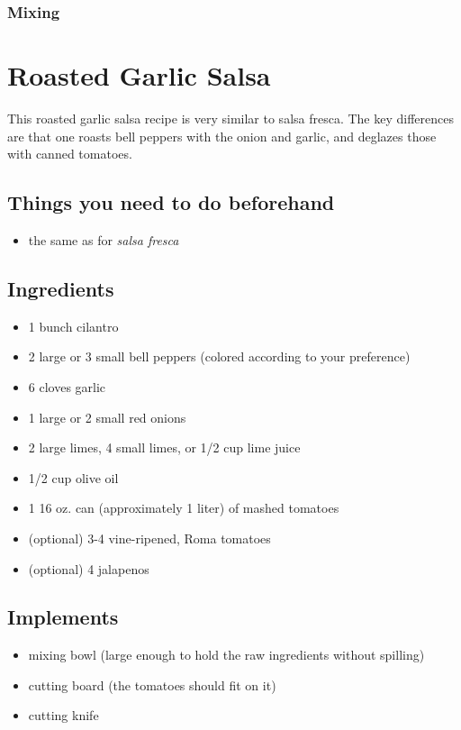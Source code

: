 \subsubsection{Mixing}

\newpage  \section{Roasted Garlic Salsa}

This roasted garlic salsa recipe is very similar to salsa fresca. The key differences are that one roasts bell peppers with the onion and garlic, and deglazes those with canned tomatoes.

\subsection{Things you need to do beforehand} \begin{itemize}
    \item the same as for \textit{salsa fresca}
\end{itemize} 

\subsection{Ingredients} \begin{itemize}
    \item 1 bunch cilantro
    \item 2 large or 3 small bell peppers (colored according to your preference)
    \item 6 cloves garlic
    \item 1 large or 2 small red onions
    \item 2 large limes, 4 small limes, or 1/2 cup lime juice
    \item 1/2 cup olive oil
    \item 1 16 oz. can (approximately 1 liter) of mashed tomatoes
    \item (optional) 3-4 vine-ripened, Roma tomatoes
    \item (optional) 4 jalapenos
\end{itemize}

\subsection{Implements} \begin{itemize}
    \item mixing bowl (large enough to hold the raw ingredients without spilling)
    \item cutting board (the tomatoes should fit on it)
    \item cutting knife
\end{itemize}

